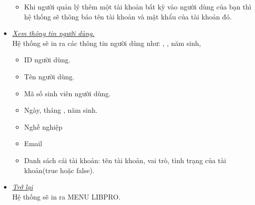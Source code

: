 \documentclass[16pt,a4paper,oneside]{article}
\begin{document}
\begin{itemize}
\begin{itemize}
	\item Khi người quản lý thêm một tài khoản bất kỳ vào người dùng của bạn thì hệ thống sẽ thông báo tên tài khoản và mật khẩu của tài khoản đó.
\end{itemize}
\item \underline{\textit{Xem thông tin người dùng.}}\\
Hệ thống sẽ in ra các thông tin người dùng như: , ,  năm sinh,
\begin{itemize}
	\item ID người dùng.
	\item Tên người dùng.
	\item Mã số sinh viên người dùng.
	\item Ngày, tháng , năm sinh.
	\item Nghề nghiệp
	\item Email
	\item Danh sách cái tài khoản: tên tài khoản, vai trò, tình trạng của tài khoản(true hoặc false).
\end{itemize}
\item \underline{\textit{Trở lại}}\\
Hệ thống sẽ in ra MENU LIBPRO.
\end{itemize}
\end{document}
